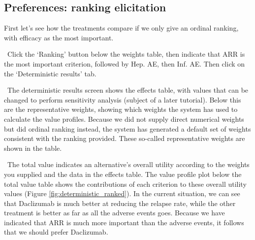 \documentclass[00_mcda_tutorial.tex]{subfiles}
\begin{document}
\subsection*{Preferences: ranking elicitation}
First let’s see how the treatments compare if we only give an ordinal ranking, with efficacy as the most important.
\newline

\noindent \leftpointright \, Click the ‘Ranking’ button below the weights table, then indicate that ARR is the most important criterion, followed by Hep. AE, then Inf. AE. Then click on the ‘Deterministic results’ tab.
\newline

\noindent \faGraduationCap \, The deterministic results screen shows the effects table, with values that can be changed to perform sensitivity analysis (subject of a later tutorial). Below this are the representative weights, showing which weights the system has used to calculate the value profiles. Because we did not supply direct numerical weights but did ordinal ranking instead, the system has generated a default set of weights consistent with the ranking provided. These so-called representative weights are shown in the table.
\newline

\noindent \faGraduationCap \, The total value indicates an alternative’s overall utility according to the weights you supplied and the data in the effects table. The value profile plot below the total value table shows the contributions of each criterion to these overall utility values (Figure \ref{fig:deterministic_ranked}). In the current situation, we can see that Daclizumab is much better at reducing the relapse rate, while the other treatment is better as far as all the adverse events goes. Because we have indicated that ARR is much more important than the adverse events, it follows that we should prefer Daclizumab.
\end{document}
